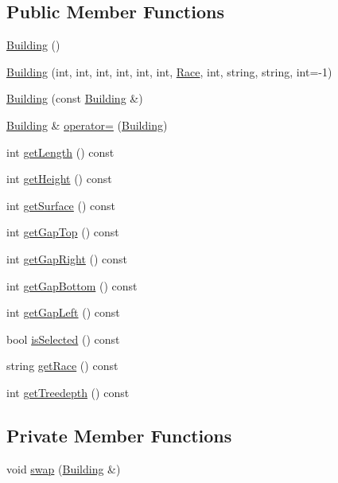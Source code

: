 \subsection*{Public Member Functions}
\begin{DoxyCompactItemize}
\item 
\hyperlink{classghost_1_1Building_a57d16dc6bf4b41cbcf67f2b51a416410}{Building} ()
\item 
\hyperlink{classghost_1_1Building_a453e89a96f541b6f87360ba18ccffaf0}{Building} (int, int, int, int, int, int, \hyperlink{namespaceghost_a8b1db75c40c6980adcf244ddccc0324b}{Race}, int, string, string, int=-\/1)
\item 
\hyperlink{classghost_1_1Building_a4fec1171ac6ce8c22e44681200d9df3d}{Building} (const \hyperlink{classghost_1_1Building}{Building} \&)
\item 
\hyperlink{classghost_1_1Building}{Building} \& \hyperlink{classghost_1_1Building_a36eaa020dfdde36ded82afc6d29fbbab}{operator=} (\hyperlink{classghost_1_1Building}{Building})
\item 
int \hyperlink{classghost_1_1Building_ae5adc91a4fb5c3ec026e8542eb8be76a}{get\-Length} () const 
\item 
int \hyperlink{classghost_1_1Building_abb174f1ec24c6936c64e95fe8cbddc48}{get\-Height} () const 
\item 
int \hyperlink{classghost_1_1Building_ad2239fc3e97e16d32f8c59377c65d235}{get\-Surface} () const 
\item 
int \hyperlink{classghost_1_1Building_aacd84477ad15ae6f40394e3d429ccb4e}{get\-Gap\-Top} () const 
\item 
int \hyperlink{classghost_1_1Building_a7858048798ed743c3251e314faf387b5}{get\-Gap\-Right} () const 
\item 
int \hyperlink{classghost_1_1Building_a1841953866459a82a05b42cb2377ba8b}{get\-Gap\-Bottom} () const 
\item 
int \hyperlink{classghost_1_1Building_ae5f7027727b6d00be6a224413806b8a3}{get\-Gap\-Left} () const 
\item 
bool \hyperlink{classghost_1_1Building_ae4636ee68f4f2493fd130ae2ebbada97}{is\-Selected} () const 
\item 
string \hyperlink{classghost_1_1Building_aa0790461f340323017c8a590ab26e9f0}{get\-Race} () const 
\item 
int \hyperlink{classghost_1_1Building_a8863fda0284ccf1b765821c0d8a3e0eb}{get\-Treedepth} () const 
\end{DoxyCompactItemize}
\subsection*{Private Member Functions}
\begin{DoxyCompactItemize}
\item 
void \hyperlink{classghost_1_1Building_a3bd95117c9a9b063190962f1fd972ff7}{swap} (\hyperlink{classghost_1_1Building}{Building} \&)
\end{DoxyCompactItemize}
